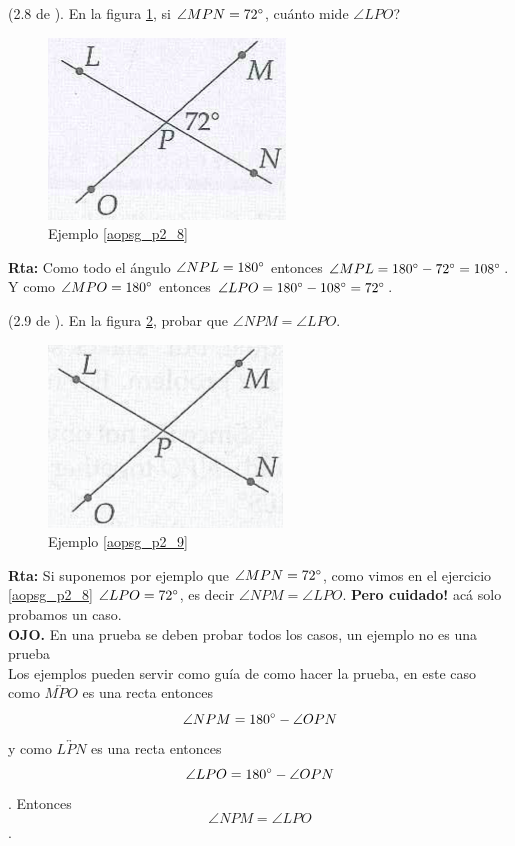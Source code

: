 \begin{ejemplo}
	\label{aopsg_p2_8}
	(2.8 de \cite{Aops_Geometria}). En la figura \ref{aopsgeo_p2_8}, si $\angle MPN=72\degree$, cuánto mide $\angle LPO$?
	
	\begin{figure}[H]
		\centering
		\includegraphics[width=0.6\linewidth]{Geometria/imgs/aopsgeo_p2_8}
		\caption{Ejemplo \ref{aopsg_p2_8}}
		\label{aopsgeo_p2_8}
	\end{figure}
	\textbf{Rta:} Como todo el ángulo $\angle NPL = 180\degree $ entonces $\angle MPL = 180\degree - 72\degree = 108\degree $. Y como $\angle MPO = 180\degree $ entonces $\angle LPO = 180\degree - 108\degree = 72\degree $.
\end{ejemplo}

\begin{ejemplo}
	\label{aopsg_p2_9}
	(2.9 de \cite{Aops_Geometria}). En la figura \ref{aopsgeo_p2_9}, probar que $\angle NPM = \angle LPO$.
	
	\begin{figure}[H]
		\centering
		\includegraphics[width=0.6\linewidth]{Geometria/imgs/aopsgeo_p2_9}
		\caption{Ejemplo \ref{aopsg_p2_9}}
		\label{aopsgeo_p2_9}
	\end{figure}
	\textbf{Rta:} Si suponemos por ejemplo que $\angle MPN=72\degree$, como vimos en el ejercicio \ref{aopsg_p2_8} $\angle LPO = 72\degree $, es decir $\angle NPM = \angle LPO$. \textbf{Pero cuidado!} acá solo probamos un caso.
	\\
	\textbf{OJO. }En una prueba se deben probar todos los casos, un ejemplo no es una prueba
	\\
	Los ejemplos pueden servir como guía de como hacer la prueba, en este caso como $\overleftrightarrow{MPO}$ es una recta entonces $$\angle NPM = 180\degree - \angle OPN $$ y como $\overleftrightarrow{LPN}$ es una recta  entonces $$\angle LPO = 180\degree - \angle OPN$$. Entonces $$\angle NPM = \angle LPO$$.
\end{ejemplo}

